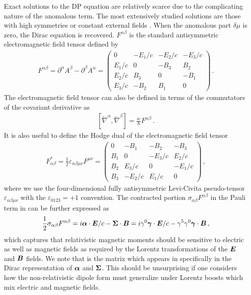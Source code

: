 Exact solutions to the DP equation are relatively scarce due to the complicating nature of the anomalous term. The most extensively studied solutions are those with high symmetries or constant external fields \citep{Thaller:1992ji}. When the anomalous part $\delta\mu$ is zero, the Dirac equation is recovered. $F^{\alpha\beta}$ is the standard antisymmetric electromagnetic field tensor defined by
\begin{gather}
    \label{em:1}
    F^{\alpha\beta} = \partial^{\alpha}A^{\beta} - \partial^{\beta}A^{\alpha} = 
    \begin{pmatrix}
        0        & -E_{1}/c  & -E_{2}/c  & -E_{3}/c\\
        E_{1}/c  & 0         & -B_{3}    & B_{2}\\
        E_{2}/c  & B_{3}     & 0         & -B_{1}\\
        E_{3}/c  & -B_{2}    & B_{1}     & 0
    \end{pmatrix}\,.
\end{gather}
The electromagnetic field tensor can also be defined in terms of the commutators of the covariant derivative  as
\begin{align}
    \label{curve:1}
    \left[\widetilde\nabla^{\alpha},\widetilde\nabla^{\beta}\right]=
    \frac{ie}{\hbar}F^{\alpha\beta}\,.
\end{align}
It is also useful to define the Hodge dual of the electromagnetic field tensor
\begin{gather}
    \label{em:2}
    F_{\alpha\beta}^{*} = \frac{1}{2}\varepsilon_{\alpha\beta\mu\nu}F^{\mu\nu} = 
    \begin{pmatrix}
        0        & -B_{1}  & -B_{2}  & -B_{3}\\
        B_{1}  & 0         & -E_{3}/c    & E_{2}/c\\
        B_{2}  & E_{3}/c     & 0         & -E_{1}/c\\
        B_{3}  & -E_{2}/c    & E_{1}/c     & 0
    \end{pmatrix}\,,
\end{gather}
where we use the four-dimensional fully antisymmetric Levi-Civita pseudo-tensor $\varepsilon_{\alpha\beta\mu\nu}$ with the $\varepsilon_{0123}=+1$ convention. The contracted portion $\sigma_{\alpha\beta}F^{\alpha\beta}$ in the Pauli term in  can be further expressed as
\begin{alignat}{1}
	\label{dp:2} \frac{1}{2}\sigma_{\alpha\beta}F^{\alpha\beta} = i\boldsymbol{\alpha}\cdot\boldsymbol{E}/c-\boldsymbol{\Sigma}\cdot\boldsymbol{B} = i\gamma^{0}\boldsymbol{\gamma}\cdot\boldsymbol{E}/c-\gamma^{5}\gamma^{0}\boldsymbol{\gamma}\cdot\boldsymbol{B}\,,
\end{alignat}
which captures that relativistic magnetic moments should be sensitive to electric as well as magnetic fields as required by the Lorentz transformations of the $\boldsymbol{E}$ and $\boldsymbol{B}$ fields. We note that  is the matrix which appears in  specifically in the Dirac representation of $\boldsymbol{\alpha}$ and $\boldsymbol{\Sigma}$. This should be unsurprising if one considers how the non-relativistic dipole form must generalize under Lorentz boosts which mix electric and magnetic fields.

